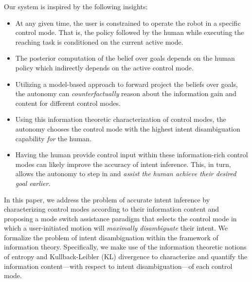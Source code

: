 \documentclass[conference]{IEEEtran}
\begin{document}
Our system is inspired by the following insights:
\begin{itemize}
	\item At any given time, the user is constrained to operate the robot in a specific control mode. That is, the policy followed by the human while executing the reaching task is conditioned on the current active mode. 
	\item The posterior computation of the belief over goals depends on the human policy which indirectly depends on the active control mode. 
	\item Utilizing a model-based approach to forward project the beliefs over goals, the autonomy can \textit{counterfactually } reason about the information gain and content for different control modes. 
	\item Using this information theoretic characterization of control modes, the autonomy chooses the control mode with the highest intent disambiguation capability \textit{for} the human.
	\item Having the human provide control input within these information-rich control modes can likely improve the accuracy of intent inference. This, in turn, allows the autonomy to step in and \textit{assist the human achieve their desired goal earlier}. 
\end{itemize}
 

In this paper, we address the problem of accurate intent inference by characterizing control modes according to their information content and proposing a mode switch assistance paradigm that selects the control mode in which a user-initiated motion will \textit{maximally disambiguate} their intent. We formalize the problem of intent disambiguation within the framework of information theory. Specifically, we make use of the information theoretic notions of entropy and Kullback-Leibler (KL) divergence to characterize and quantify the information content---with respect to intent disambiguation---of each control mode. 
\end{document}
